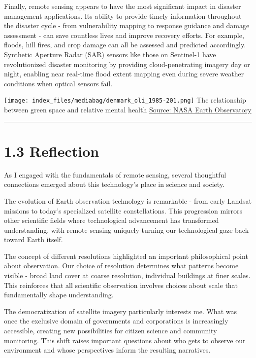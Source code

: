 \documentclass[
  letterpaper,
  DIV=11,
  numbers=noendperiod]{scrreprt}
\begin{document}
Finally, remote sensing appears to have the most significant impact in
disaster management applications. Its ability to provide timely
information throughout the disaster cycle - from vulnerability mapping
to response guidance and damage assessment - can save countless lives
and improve recovery efforts. For example, floods, hill fires, and crop
damage can all be assessed and predicted accordingly. Synthetic Aperture
Radar (SAR) sensors like those on Sentinel-1 have revolutionized
disaster monitoring by providing cloud-penetrating imagery day or night,
enabling near real-time flood extent mapping even during severe weather
conditions when optical sensors fail.

\texttt{[image: index\_files/mediabag/denmark\_oli\_1985-201.png]} The
relationship between green space and relative mental health
\href{https://earthobservatory.nasa.gov/images/145305/summer-heat-shifts-to-europe}{Source:
NASA Earth Observatory}

\begin{center}\rule{0.5\linewidth}{0.5pt}\end{center}

\section{1.3 Reflection}\label{reflection}

As I engaged with the fundamentals of remote sensing, several thoughtful
connections emerged about this technology's place in science and
society.

The evolution of Earth observation technology is remarkable - from early
Landsat missions to today's specialized satellite constellations. This
progression mirrors other scientific fields where technological
advancement has transformed understanding, with remote sensing uniquely
turning our technological gaze back toward Earth itself.

The concept of different resolutions highlighted an important
philosophical point about observation. Our choice of resolution
determines what patterns become visible - broad land cover at coarse
resolution, individual buildings at finer scales. This reinforces that
all scientific observation involves choices about scale that
fundamentally shape understanding.

The democratization of satellite imagery particularly interests me. What
was once the exclusive domain of governments and corporations is
increasingly accessible, creating new possibilities for citizen science
and community monitoring. This shift raises important questions about
who gets to observe our environment and whose perspectives inform the
resulting narratives.
\end{document}
